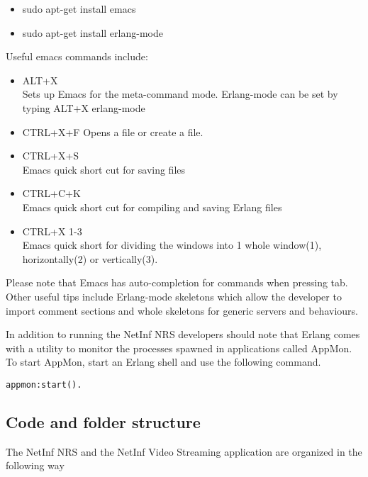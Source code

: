 \begin{itemize}
\item sudo apt-get install emacs
\item sudo apt-get install erlang-mode
\end{itemize}

Useful emacs commands include:

\begin{itemize}
\item ALT+X \\
Sets up Emacs for the meta-command mode. Erlang-mode can be set by typing
ALT+X erlang-mode
\item CTRL+X+F
Opens a file or create a file. 
\item CTRL+X+S \\
Emacs quick short cut for saving files
\item CTRL+C+K \\
Emacs quick short cut for compiling and saving Erlang files
\item CTRL+X 1-3 \\
Emacs quick short for dividing the windows into 1 whole window(1), horizontally(2) or vertically(3).
\end{itemize}

Please note that Emacs has auto-completion for commands when pressing tab. Other useful tips include Erlang-mode skeletons which allow the developer to import comment sections and whole skeletons for generic servers and behaviours.

In addition to running the NetInf NRS developers should note that Erlang comes with a utility to monitor the processes spawned in applications called AppMon. To start AppMon, start an Erlang shell and use the following command.

\begin{verbatim}
appmon:start(). 
\end{verbatim}


\subsection {Code and folder structure}

The NetInf NRS and the NetInf Video Streaming application are organized in the following way

